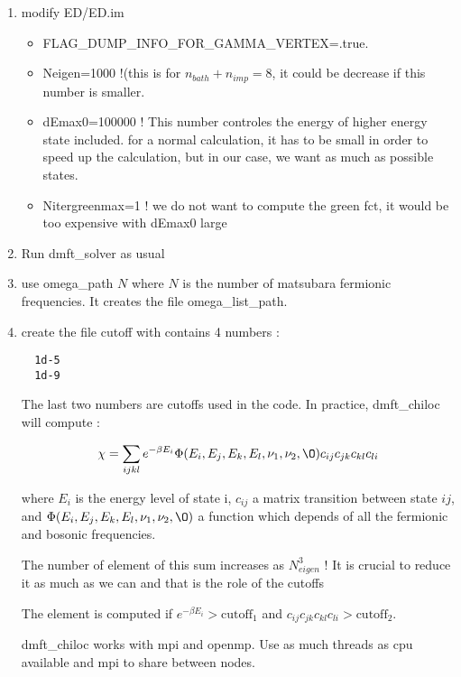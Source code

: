 \documentclass{book}
\def\b{\beta}
\def\v{\nu}
\begin{document}
\begin{enumerate}
\item modify ED/ED.im
  \begin{itemize}
  \item FLAG\_DUMP\_INFO\_FOR\_GAMMA\_VERTEX=.true.
  \item Neigen=1000 !(this is for $n_{bath}+n_{imp} = 8$, it could be decrease if this number is smaller.
  \item dEmax0=100000 !  This number controles the energy of higher energy state included. for a normal calculation, it has to be small in order to speed up the calculation, but in our case, we want as much as possible states.
  \item  Nitergreenmax=1 ! we do not want to compute the green fct, it would be too expensive with  dEmax0 large
  \end{itemize}

\item Run dmft\_solver as usual

\item use omega\_path $N$ where $N$ is the number of matsubara fermionic frequencies. It creates the file omega\_list\_path.

\item create the file cutoff with contains 4 numbers :

\begin{lstlisting}
  1d-5
  1d-9
\end{lstlisting}
The last two numbers are cutoffs used in the code.
In practice, dmft\_chiloc will  compute  :

\begin{equation}
  \chi = \sum_{ijkl} e^{-\b E_i} \Phi(E_i,E_j,E_k,E_l,\v_1,\v_2,\O) c_{ij}c_{jk}c_{kl}c_{li}
\end{equation}

where $E_i$ is the energy level of state i,  $c_{ij}$ a matrix transition between state $ij$, and  $ \Phi(E_i,E_j,E_k,E_l,\v_1,\v_2,\O)$ a function which depends of all the fermionic and bosonic frequencies.

The number of element of this sum increases as $N_{eigen}^3$ ! It is crucial to reduce it as much as we can and that is the role of the cutoffs

The element is computed if $e^{-\b E_i} >\text{cutoff}_1$ and $c_{ij}c_{jk}c_{kl}c_{li} >\text{cutoff}_2$.


dmft\_chiloc works with mpi and openmp. Use as much threads as cpu available  and mpi to share between nodes.



\end{enumerate}
\end{document}
